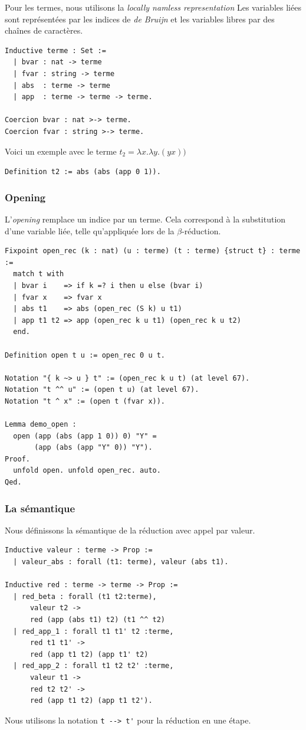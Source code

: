 \documentclass[11pt]{book}
\begin{document}
Pour les termes, nous utilisons la \textit{locally namless representation}
Les variables liées sont représentées par les indices de \textit{de Bruijn} et les variables 
libres par des chaînes de caractères.
\begin{Verbatim}
Inductive terme : Set :=
  | bvar : nat -> terme
  | fvar : string -> terme
  | abs  : terme -> terme
  | app  : terme -> terme -> terme.

Coercion bvar : nat >-> terme.
Coercion fvar : string >-> terme.
\end{Verbatim}
Voici un exemple avec le terme $t_2 = \lambda x.\lambda y. (y x)) $

\verb+Definition t2 := abs (abs (app 0 1)).+

\subsubsection{Opening}
L'\textit{opening} remplace un indice par un terme. 
Cela correspond à la substitution d'une variable liée, telle qu'appliquée lors de la 
$\beta$-réduction.

\begin{Verbatim}
Fixpoint open_rec (k : nat) (u : terme) (t : terme) {struct t} : terme :=
  match t with
  | bvar i    => if k =? i then u else (bvar i)
  | fvar x    => fvar x
  | abs t1    => abs (open_rec (S k) u t1)
  | app t1 t2 => app (open_rec k u t1) (open_rec k u t2)
  end.

Definition open t u := open_rec 0 u t.

Notation "{ k ~> u } t" := (open_rec k u t) (at level 67).
Notation "t ^^ u" := (open t u) (at level 67).
Notation "t ^ x" := (open t (fvar x)).

Lemma demo_open :
  open (app (abs (app 1 0)) 0) "Y" =
       (app (abs (app "Y" 0)) "Y").
Proof.
  unfold open. unfold open_rec. auto.
Qed.
\end{Verbatim}

\subsubsection{La sémantique} 
Nous définissons la sémantique de la réduction avec appel par valeur.

\begin{Verbatim}
Inductive valeur : terme -> Prop :=
  | valeur_abs : forall (t1: terme), valeur (abs t1).

Inductive red : terme -> terme -> Prop :=
  | red_beta : forall (t1 t2:terme),
      valeur t2 ->
      red (app (abs t1) t2) (t1 ^^ t2)
  | red_app_1 : forall t1 t1' t2 :terme,
      red t1 t1' ->
      red (app t1 t2) (app t1' t2)
  | red_app_2 : forall t1 t2 t2' :terme,
      valeur t1 ->
      red t2 t2' ->
      red (app t1 t2) (app t1 t2').

\end{Verbatim}
Nous utilisons la notation \verb+t --> t'+ pour la réduction en une étape.
\end{document}
